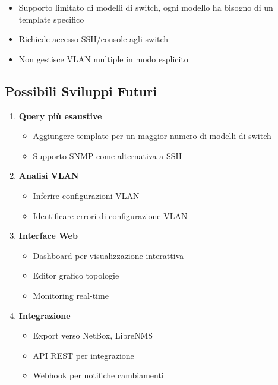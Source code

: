 \documentclass[12pt,a4paper]{article}
\begin{document}
\begin{itemize}
    \item Supporto limitato di modelli di switch, ogni modello ha bisogno di un template specifico
    \item Richiede accesso SSH/console agli switch
    \item Non gestisce VLAN multiple in modo esplicito
\end{itemize}

\subsection{Possibili Sviluppi Futuri}

\begin{enumerate}
    \item \textbf{Query più esaustive}
    \begin{itemize}
        \item Aggiungere template per un maggior numero di modelli di switch
        \item Supporto SNMP come alternativa a SSH
    \end{itemize}
    
    \item \textbf{Analisi VLAN}
    \begin{itemize}
        \item Inferire configurazioni VLAN
        \item Identificare errori di configurazione VLAN
    \end{itemize}
    
    \item \textbf{Interface Web}
    \begin{itemize}
        \item Dashboard per visualizzazione interattiva
        \item Editor grafico topologie
        \item Monitoring real-time
    \end{itemize}
    
    \item \textbf{Integrazione}
    \begin{itemize}
        \item Export verso NetBox, LibreNMS
        \item API REST per integrazione
        \item Webhook per notifiche cambiamenti
    \end{itemize}
\end{enumerate}
\end{document}
